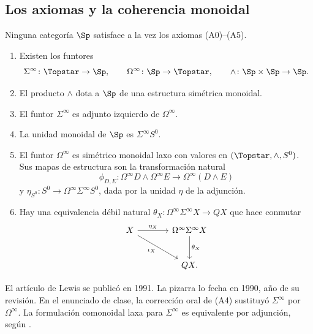 \subsection{Los axiomas y la coherencia monoidal}

\begin{samepage}
\begin{teo}[Lewis]\label{teo:c26-lewis}
Ninguna categoría $\Sp$ satisface a la vez los axiomas \textup{(A0)--(A5)}.
\begin{enumerate}[label=\textup{(A\arabic*)},start=0,leftmargin=3.2em]
\item Existen los funtores
\[
\Sigma^\infty\colon\Topstar\to\Sp,\qquad
\Omega^\infty\colon\Sp\to\Topstar,\qquad
\wedge\colon\Sp\times\Sp\to\Sp.
\]
\item El producto $\wedge$ dota a $\Sp$ de una estructura simétrica monoidal.
\item El funtor $\Sigma^\infty$ es adjunto izquierdo de $\Omega^\infty$.
\item La unidad monoidal de $\Sp$ es $\Sigma^\infty S^0$.
\item El funtor $\Omega^\infty$ es simétrico monoidal laxo con valores en $(\Topstar,\wedge,S^0)$. Sus mapas de estructura son la transformación natural
\[
\phi_{D,E}\colon \Omega^\infty D\wedge\Omega^\infty E
\longrightarrow \Omega^\infty(D\wedge E)
\]
y $\eta_{S^0}\colon S^0\to\Omega^\infty\Sigma^\infty S^0$, dada por la unidad $\eta$ de la adjunción.
\item Hay una equivalencia débil natural $\theta_X\colon \Omega^\infty\Sigma^\infty X\to QX$ que hace conmutar
\[
\begin{tikzcd}[column sep=large,row sep=large]
X\arrow[r,"\eta_X"]\arrow[dr,"\iota_X"']&
\Omega^\infty\Sigma^\infty X\arrow[d,"\theta_X"]\\
&QX .
\end{tikzcd}
\]
\end{enumerate}
\end{teo}
\end{samepage}

\begin{nota}
El artículo de Lewis se publicó en 1991. La pizarra lo fecha en 1990, año de su revisión. En el enunciado de clase, la corrección oral de (A4) sustituyó $\Sigma^\infty$ por $\Omega^\infty$. La formulación comonoidal laxa para $\Sigma^\infty$ es equivalente por adjunción, según \cite[§~2, lema~2.2]{lewis1991}.
\end{nota}

